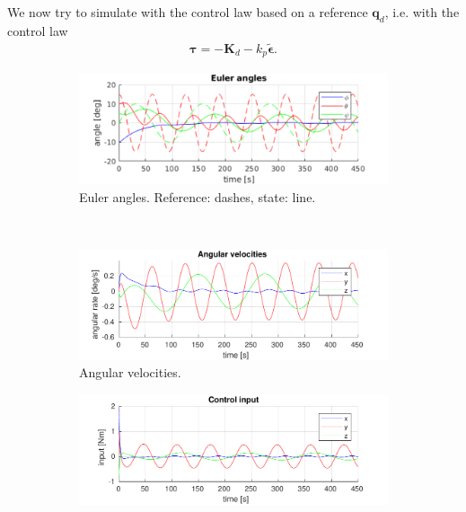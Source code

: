 \subsection{}
We now try to simulate with the control law based on a reference $\mathbf{q}_d$, i.e. with the control law
\begin{equation}\begin{aligned}
\label{eq:control_law_error}
\boldsymbol{\tau} = - \mathbf{K}_d -k_p \tilde{\boldsymbol{\epsilon}}.
\end{aligned}\end{equation}
\begin{figure}[H]
	\centering
	\begin{subfigure}[b]{0.45\textwidth}
		\includegraphics[width=\textwidth]{../matlab/1_5_euler_angles}
		\caption{Euler angles. Reference: dashes, state: line.}
		\label{fig:5a}
	\end{subfigure}
	~ %
	\begin{subfigure}[b]{0.45\textwidth}
		\includegraphics[width=\textwidth]{../matlab/1_5_angular_velocities}
		\caption{Angular velocities.}
		\label{fig:5b}
	\end{subfigure}
	\begin{subfigure}[b]{0.45\textwidth}
		\includegraphics[width=\textwidth]{../matlab/1_5_control_input}

\end{subfigure}
\end{figure}
